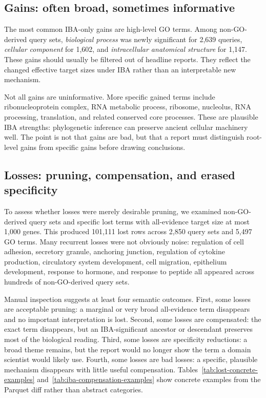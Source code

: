 \documentclass[11pt]{article}
\begin{document}
\subsection{Gains: often broad, sometimes informative}

The most common IBA-only gains are high-level GO terms. Among non-GO-derived query sets, \emph{biological process} was newly significant for 2,639 queries, \emph{cellular component} for 1,602, and \emph{intracellular anatomical structure} for 1,147. These gains should usually be filtered out of headline reports. They reflect the changed effective target sizes under IBA rather than an interpretable new mechanism.

Not all gains are uninformative. More specific gained terms include ribonucleoprotein complex, RNA metabolic process, ribosome, nucleolus, RNA processing, translation, and related conserved core processes. These are plausible IBA strengths: phylogenetic inference can preserve ancient cellular machinery well. The point is not that gains are bad, but that a report must distinguish root-level gains from specific gains before drawing conclusions.

\subsection{Losses: pruning, compensation, and erased specificity}

To assess whether losses were merely desirable pruning, we examined non-GO-derived query sets and specific lost terms with all-evidence target size at most 1,000 genes. This produced 101,111 lost rows across 2,850 query sets and 5,497 GO terms. Many recurrent losses were not obviously noise: regulation of cell adhesion, secretory granule, anchoring junction, regulation of cytokine production, circulatory system development, cell migration, epithelium development, response to hormone, and response to peptide all appeared across hundreds of non-GO-derived query sets.

Manual inspection suggests at least four semantic outcomes. First, some losses are acceptable pruning: a marginal or very broad all-evidence term disappears and no important interpretation is lost. Second, some losses are compensated: the exact term disappears, but an IBA-significant ancestor or descendant preserves most of the biological reading. Third, some losses are specificity reductions: a broad theme remains, but the report would no longer show the term a domain scientist would likely use. Fourth, some losses are bad losses: a specific, plausible mechanism disappears with little useful compensation. Tables~\ref{tab:lost-concrete-examples} and~\ref{tab:iba-compensation-examples} show concrete examples from the Parquet diff rather than abstract categories.
\end{document}
